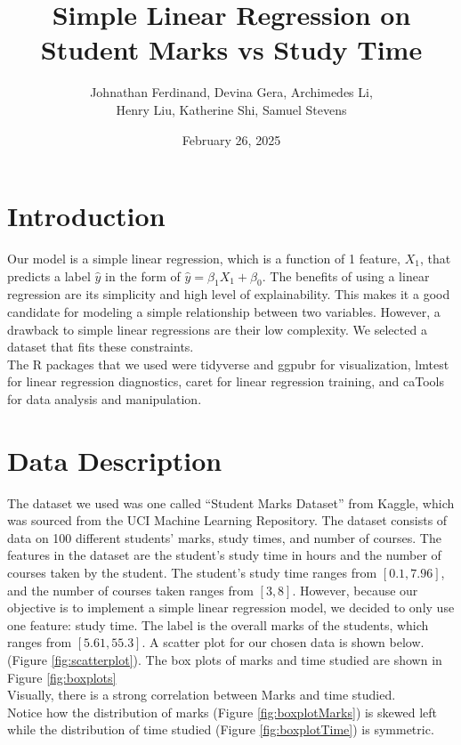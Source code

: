\documentclass{article}
\title{Simple Linear Regression on Student Marks vs Study Time}
\author{Johnathan Ferdinand, Devina Gera, Archimedes Li, \\ Henry Liu, Katherine Shi, Samuel Stevens}
\date{February 26, 2025}
\begin{document}
\maketitle

\section{Introduction}
Our model is a simple linear regression, which is a function of 1 feature, $X_1$, that predicts a label $\hat{y}$ in the form of $\hat{y} = \beta_1X_1 + \beta_0$.  
The benefits of using a linear regression are its simplicity and high level of explainability.  
This makes it a good candidate for modeling a simple relationship between two variables.  
However, a drawback to simple linear regressions are their low complexity.  We selected a dataset that fits these constraints. \\

\noindent The R packages that we used were tidyverse and ggpubr for visualization, lmtest for linear regression diagnostics, caret for linear regression training, and caTools for data analysis and manipulation.

\section{Data Description}
The dataset we used was one called “Student Marks Dataset” from Kaggle, which was sourced from the UCI Machine Learning Repository. The dataset consists of data on 100 different students' marks, study times, and number of courses.  
The features in the dataset are the student’s study time in hours and the number of courses taken by the student.  
The student’s study time ranges from $[0.1, 7.96]$, and the number of courses taken ranges from $[3, 8]$. 
However, because our objective is to implement a simple linear regression model, we decided to only use one feature: study time.
The label is the overall marks of the students, which ranges from $[5.61, 55.3]$.  
A scatter plot for our chosen data is shown below. 
(Figure \ref{fig:scatterplot}). The box plots of marks and time studied are shown in Figure \ref{fig:boxplots} \\
\noindent Visually, there is a strong correlation between Marks and time studied. \\

\noindent Notice how the distribution of marks (Figure \ref{fig:boxplotMarks}) is skewed left while the distribution of time studied (Figure \ref{fig:boxplotTime}) is symmetric.
\clearpage
\end{document}
